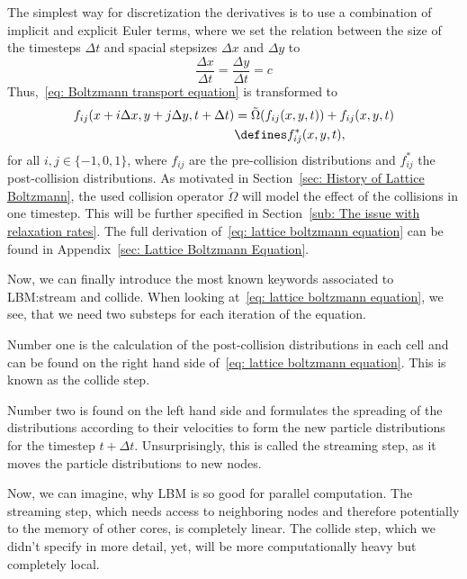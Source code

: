 The simplest way for discretization the derivatives is to use a combination of implicit and explicit Euler terms, where we set the relation between the size of the timesteps $\Delta t$ and spacial stepsizes $\Delta x$ and $\Delta y$ to
\begin{equation}
  \frac{\Delta x} {\Delta{t}} = \frac{\Delta y} {\Delta{t}} = c
\end{equation}
Thus,~\eqref{eq: Boltzmann transport equation} is transformed to
\begin{equation}
  \label{eq: lattice boltzmann equation}
  \begin{aligned}
    f_{ij}(x + i \Delta x , y + j \Delta y,t + \Delta t)
    &= \tilde{\Omega}(f_{ij}(x,y,t))
    + f_{ij}(x,y,t)
    \\&
    \defines f_{ij}^*(x, y, t),
  \end{aligned}
\end{equation}
for all $i,j\in \{-1, 0, 1\}$,
where $f_{ij}$ are the pre-collision distributions and $f_{ij}^*$ the post-collision distributions.
As motivated in Section~\ref{sec: History of Lattice Boltzmann}, the used collision operator $\tilde{\Omega}$ will model the effect of the collisions in one timestep. This will be further specified in Section~\ref{sub: The issue with relaxation rates}.
The full derivation of~\eqref{eq: lattice boltzmann equation} can be found in Appendix~\ref{sec: Lattice Boltzmann Equation}.

Now, we can finally introduce the most known keywords associated to LBM:\@ stream and collide.
When looking at~\eqref{eq: lattice boltzmann equation}, we see, that we need two substeps for each iteration of the equation.

Number one is the calculation of the post-collision distributions in each cell and can be found on the right hand side of~\eqref{eq: lattice boltzmann equation}. This is known as the collide step.

Number two is found on the left hand side and formulates the spreading of the distributions according to their velocities to form the new particle distributions for the timestep $t+\Delta t$.
Unsurprisingly, this is called the streaming step, as it moves the particle distributions to new nodes.

Now, we can imagine, why LBM is so good for parallel computation.
The streaming step, which needs access to neighboring nodes and therefore potentially to the memory of other cores, is completely linear.
The collide step, which we didn't specify in more detail, yet, will be more computationally heavy but completely local.
